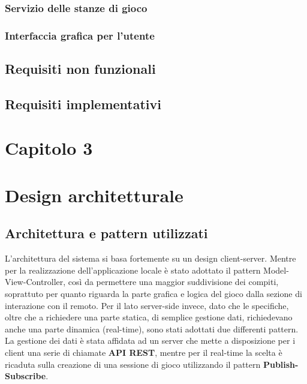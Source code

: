             \subsubsection[Stanze di gioco]{\large {Servizio delle stanze di gioco}\label{subsub:requirements:lobby}}
            \subsubsection[Interfaccia utente]{\large {Interfaccia grafica per l'utente}\label{subsub:requirements:gui}}
        \subsection {Requisiti non funzionali}\label{subsec:requirements:notFunctional}
        \subsection {Requisiti implementativi}\label{subsec:requirements:implementative}
   
   \clearpage
    \section*{\Huge {\textbf Capitolo 3}\label{chapter3}}
    \section{Design architetturale}\label{sec:design}
       
        
        \subsection[Architettura]{Architettura e pattern utilizzati}\label{subsec:architecture}
         L'architettura del sistema si basa fortemente su un design client-server. 
        Mentre per la realizzazione dell'applicazione locale è stato adottato il pattern Model-View-Controller, così da permettere una maggior suddivisione dei compiti, soprattuto per quanto riguarda la parte grafica e logica del gioco dalla sezione di interazione con il remoto. 
        Per il lato server-side invece, dato che le specifiche, oltre che a richiedere una parte statica, di semplice gestione dati, richiedevano anche una parte dinamica (real-time), sono stati adottati due differenti pattern. 
        \\
        La gestione dei dati è stata affidata ad un server che mette a disposizione per i client una serie di chiamate \textbf{API REST}, mentre per il real-time la scelta è ricaduta sulla creazione di una sessione di gioco utilizzando il pattern \textbf{Publish-Subscribe}.
        
